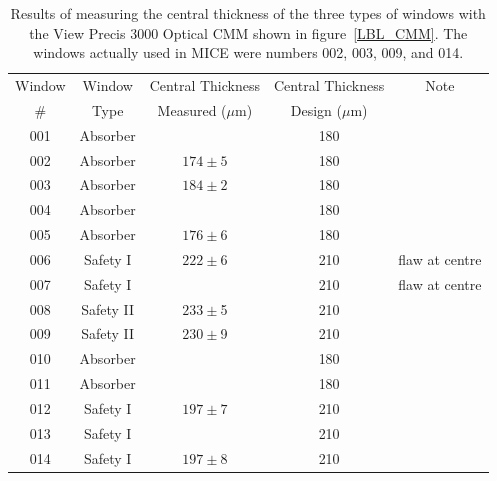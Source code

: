 \begin{table}
  \caption{
    Results of measuring the central thickness of the three types of
    windows with the View Precis 3000 Optical CMM shown in
    figure~\ref{LBL_CMM}.
    The windows actually used in MICE were numbers 002, 003, 009, and
    014.
  }
  \label{tab:summary}
  \begin{center}
    \begin{tabular}{|c c c  c c|}
    \hline
Window & Window & Central Thickness & Central Thickness & Note    \rule{0pt}{14pt} \\
 \#  &    Type      & Measured ($\mu$m)              & Design ($\mu$m) &  \\
\hline
001 & Absorber& & 180 & \\
002 & Absorber& $174\pm5$ &180&\\
003 & Absorber& $184\pm2$ & 180&\\
004 & Absorber&& 180&\\
005 & Absorber& $176\pm6$ & 180 &\\
006 & Safety I& $222\pm6$ &210 & flaw at centre\\
007 & Safety I& & 210&  flaw at centre\\
008 & Safety II& $233\pm$5 &210 &\\
009 & Safety II& $230\pm$9 &210 &\\
010 & Absorber&  & 180&\\
011 & Absorber&  & 180&\\
012 & Safety I& $197\pm 7$ & 210  & \\
013& Safety I & & 210  &\\
014 & Safety I & $197\pm8$ & 210 &\\
    \hline
    \end{tabular}
  \end{center}
\end{table}

